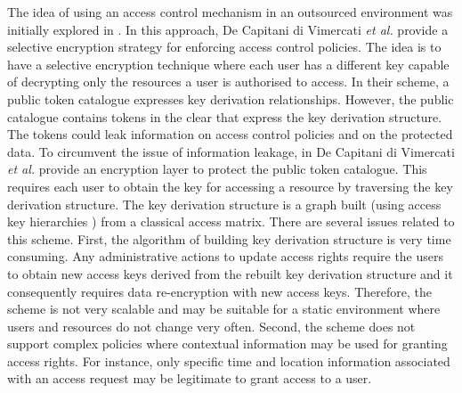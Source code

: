 \documentclass[epsfig,a4paper,11pt,titlepage]{book}
\numberwithin{algorithm}{chapter}
\begin{document}
The idea of using an access control mechanism in an outsourced environment was initially explored in \cite{Vimercati:2007:CSAW, Vimercati:2007:VLDB, Vimercati:2010}. In this approach, De Capitani di Vimercati \emph{et al.} provide a selective encryption strategy for enforcing access control policies. The idea is to have a selective encryption technique where each user has a different key capable of decrypting only the resources a user is authorised to access. In their scheme, a public token catalogue expresses key derivation relationships. However, the public catalogue contains tokens in the clear that express the key derivation structure. The tokens could leak information on access control policies and on the protected data. To circumvent the issue of information leakage, in \cite{Vimercati:2008} De Capitani di Vimercati \emph{et al.} provide an encryption layer to protect the public token catalogue. This requires each user to obtain the key for accessing a resource by traversing the key derivation structure. The key derivation structure is a graph built (using access key hierarchies \cite{Atallah:2009}) from a classical access matrix. There are several issues related to this scheme. First, the algorithm of building key derivation structure is very time consuming. Any administrative actions to update access rights require the users to obtain new access keys derived from the rebuilt key derivation structure and it consequently requires data re-encryption with new access keys. Therefore, the scheme is not very scalable and may be suitable for a static environment where users and resources do not change very often. Second, the scheme does not support complex policies where contextual information may be used for granting access rights. For instance, only specific time and location information associated with an access request may be legitimate to grant access to a user.
\end{document}
